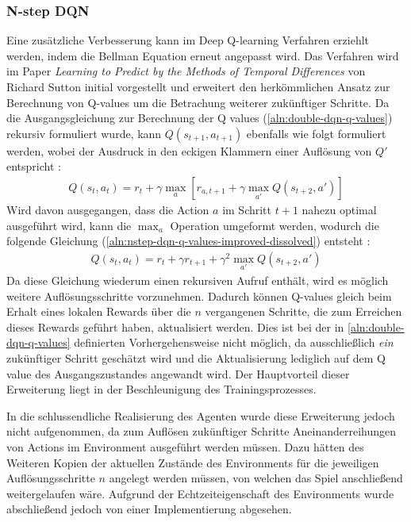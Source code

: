 \documentclass[11pt]{scrartcl}
\begin{document}
\subsubsection{N-step DQN}
Eine zusätzliche Verbesserung kann im Deep Q-learning Verfahren erziehlt werden, indem die
Bellman Equation erneut angepasst wird. Das Verfahren wird im Paper \textit{Learning to
Predict by the Methods of Temporal Differences} von Richard Sutton\cite{S1988} initial
vorgestellt und erweitert den herkömmlichen Ansatz zur Berechnung von Q-values um die
Betrachung weiterer zukünftiger Schritte. Da die Ausgangsgleichung zur Berechnung der Q
values (\ref{aln:double-dqn-q-values}) rekursiv formuliert wurde, kann $Q(s_{t+1},
a_{t+1})$ ebenfalls wie folgt formuliert werden, wobei der Ausdruck in den eckigen
Klammern einer Auflösung von $Q'$ entspricht \cite[~S.168]{L2018}:
\begin{align}
Q(s_t, a_t) = r_t + \gamma \max_{a}[r_{a,t+1}+\gamma\max_{a'}Q(s_{t+2},a')]
\label{aln:nstep-dqn-q-values-improved}
\end{align}
Wird davon ausgegangen, dass die Action $a$ im Schritt $t+1$ nahezu optimal ausgeführt wird,
kann die $\max_{a}$ Operation umgeformt werden, wodurch die folgende Gleichung
(\ref{aln:nstep-dqn-q-values-improved-dissolved}) entsteht \cite[~S.168]{L2018}:
\begin{align}
Q(s_t, a_t) = r_t + \gamma r_{t+1}+\gamma^2 \max_{a'}Q(s_{t+2},a')
\label{aln:nstep-dqn-q-values-improved-dissolved}
\end{align}
Da diese Gleichung wiederum einen rekursiven Aufruf enthält, wird es möglich weitere
Auflösungsschritte vorzunehmen. Dadurch können Q-values gleich beim Erhalt eines lokalen
Rewards über die $n$ vergangenen Schritte, die zum Erreichen dieses Rewards geführt haben,
aktualisiert werden. Dies ist bei der in \autoref{aln:double-dqn-q-values} definierten
Vorhergehensweise nicht möglich, da ausschließlich \textit{ein} zukünftiger Schritt geschätzt
wird und die Aktualisierung lediglich auf dem Q value des Ausgangszustandes angewandt wird. 
Der Hauptvorteil dieser Erweiterung liegt in der Beschleunigung des Trainingsprozesses.

In die schlussendliche Realisierung des Agenten wurde diese Erweiterung jedoch nicht
aufgenommen, da zum Auflösen zukünftiger Schritte Aneinanderreihungen von Actions im
Environment ausgeführt werden müssen. Dazu hätten des Weiteren Kopien der aktuellen
Zustände des Environments für die jeweiligen Auflösungsschritte $n$ angelegt werden
müssen, von welchen das Spiel anschließend weitergelaufen wäre. Aufgrund der
Echtzeiteigenschaft des Environments wurde abschließend jedoch von einer Implementierung
abgesehen.
\end{document}
